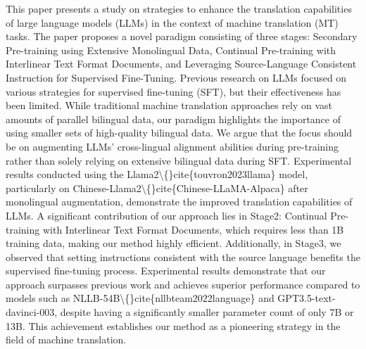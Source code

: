 This paper presents a study on strategies to enhance the translation capabilities of large language models (LLMs) in the context of machine translation (MT) tasks. The paper proposes a novel paradigm consisting of three stages: Secondary Pre-training using Extensive Monolingual Data, Continual Pre-training with Interlinear Text Format Documents, and Leveraging Source-Language Consistent Instruction for Supervised Fine-Tuning. Previous research on LLMs focused on various strategies for supervised fine-tuning (SFT), but their effectiveness has been limited. While traditional machine translation approaches rely on vast amounts of parallel bilingual data, our paradigm highlights the importance of using smaller sets of high-quality bilingual data. We argue that the focus should be on augmenting LLMs' cross-lingual alignment abilities during pre-training rather than solely relying on extensive bilingual data during SFT. Experimental results conducted using the Llama2\textbackslash\{\}cite\{touvron2023llama\} model, particularly on Chinese-Llama2\textbackslash\{\}cite\{Chinese-LLaMA-Alpaca\} after monolingual augmentation, demonstrate the improved translation capabilities of LLMs. A significant contribution of our approach lies in Stage2: Continual Pre-training with Interlinear Text Format Documents, which requires less than 1B training data, making our method highly efficient. Additionally, in Stage3, we observed that setting instructions consistent with the source language benefits the supervised fine-tuning process. Experimental results demonstrate that our approach surpasses previous work and achieves superior performance compared to models such as NLLB-54B\textbackslash\{\}cite\{nllbteam2022language\} and GPT3.5-text-davinci-003, despite having a significantly smaller parameter count of only 7B or 13B. This achievement establishes our method as a pioneering strategy in the field of machine translation.